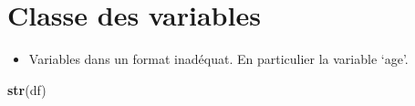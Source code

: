 \documentclass[7pt,]{report}
\newenvironment{Shaded}{\begin{snugshade}}{\end{snugshade}}
\newcommand{\KeywordTok}[1]{\textcolor[rgb]{0.13,0.29,0.53}{\textbf{#1}}}
\newcommand{\NormalTok}[1]{#1}
\providecommand{\tightlist}{%
  \setlength{\itemsep}{0pt}\setlength{\parskip}{0pt}}
\begin{document}
\hypertarget{classe-des-variables}{%
\section{Classe des variables}\label{classe-des-variables}}

\begin{itemize}
\tightlist
\item
  Variables dans un format inadéquat. En particulier la variable `age'.
\end{itemize}

\begin{Shaded}
\begin{Highlighting}[]
\KeywordTok{str}\NormalTok{(df)}
\end{Highlighting}
\end{Shaded}
\end{document}
